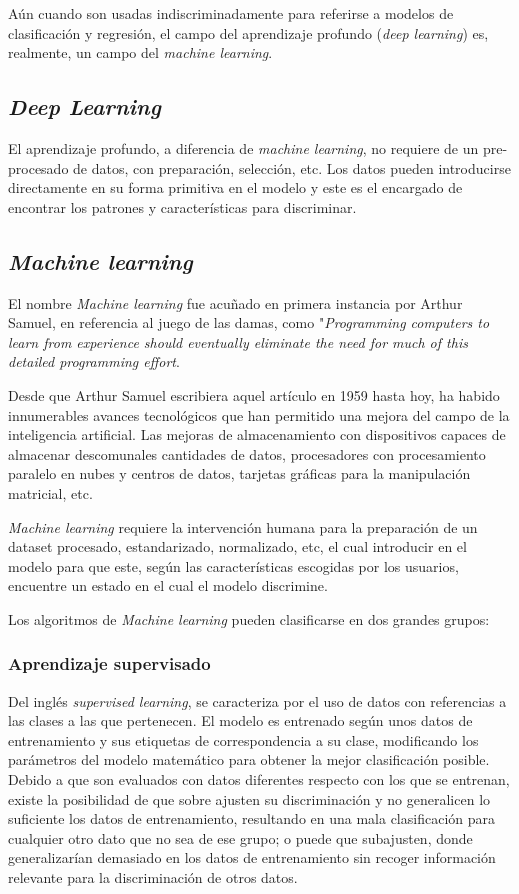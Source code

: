 Aún cuando son usadas indiscriminadamente para referirse a modelos de clasificación y regresión, el campo del aprendizaje profundo (\textit{deep learning}) es, realmente, un campo del \textit{machine learning}. 

\subsection{\textit{Deep Learning}}

El aprendizaje profundo, a diferencia de \textit{machine learning}, no requiere de un pre-procesado de datos, con preparación, selección, etc. Los datos pueden introducirse directamente en su forma primitiva en el modelo y este es el encargado de encontrar los patrones y características para discriminar.

\subsection{\textit{Machine learning}}

El nombre \textit{Machine learning} fue acuñado en primera instancia por Arthur Samuel, en referencia al juego de las damas, como "\textit{Programming computers to learn from experience should eventually eliminate the need for much of this detailed programming effort}\cite{Samuel1959SomeSI}.	

Desde que Arthur Samuel escribiera aquel artículo en 1959 hasta hoy, ha habido innumerables avances tecnológicos que han permitido una mejora del campo de la inteligencia artificial. Las mejoras de almacenamiento con dispositivos capaces de almacenar descomunales cantidades de datos, procesadores con procesamiento paralelo en nubes y centros de datos, tarjetas gráficas para la manipulación matricial, etc.

\textit{Machine learning} requiere la intervención humana para la preparación de un dataset procesado, estandarizado, normalizado, etc, el cual introducir en el modelo para que este, según las características escogidas por los usuarios, encuentre un estado en el cual el modelo discrimine.

Los algoritmos de \textit{Machine learning} pueden clasificarse en dos grandes grupos:

\subsubsection{Aprendizaje supervisado}

Del inglés \textit{supervised learning}, se caracteriza por el uso de datos con referencias a las clases a las que pertenecen. El modelo es entrenado según unos datos de entrenamiento y sus etiquetas de correspondencia a su clase, modificando los parámetros del modelo matemático para obtener la mejor clasificación posible. Debido a que son evaluados con datos diferentes respecto con los que se entrenan, existe la posibilidad de que sobre ajusten su discriminación y no generalicen lo suficiente los datos de entrenamiento, resultando en una mala clasificación para cualquier otro dato que no sea de ese grupo; o puede que subajusten, donde generalizarían demasiado en los datos de entrenamiento sin recoger información relevante para la discriminación de otros datos.

